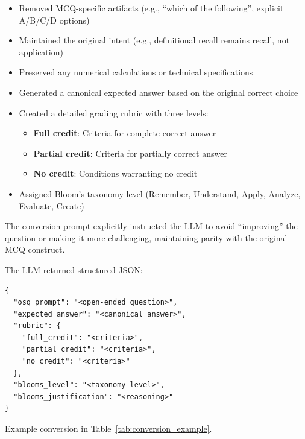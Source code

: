 \begin{itemize}
    \item Removed MCQ-specific artifacts (e.g., ``which of the following'', explicit A/B/C/D options)
    \item Maintained the original intent (e.g., definitional recall remains recall, not application)
    \item Preserved any numerical calculations or technical specifications
    \item Generated a canonical expected answer based on the original correct choice
    \item Created a detailed grading rubric with three levels:
    \begin{itemize}
        \item \textbf{Full credit}: Criteria for complete correct answer
        \item \textbf{Partial credit}: Criteria for partially correct answer
        \item \textbf{No credit}: Conditions warranting no credit
    \end{itemize}
    \item Assigned Bloom's taxonomy level (Remember, Understand, Apply, Analyze, Evaluate, Create)
\end{itemize}

The conversion prompt explicitly instructed the LLM to avoid ``improving'' the question or making it more challenging, maintaining parity with the original MCQ construct.

The LLM returned structured JSON:
\begin{verbatim}
{
  "osq_prompt": "<open-ended question>",
  "expected_answer": "<canonical answer>",
  "rubric": {
    "full_credit": "<criteria>",
    "partial_credit": "<criteria>",
    "no_credit": "<criteria>"
  },
  "blooms_level": "<taxonomy level>",
  "blooms_justification": "<reasoning>"
}
\end{verbatim}

Example conversion in Table~\ref{tab:conversion_example}.

